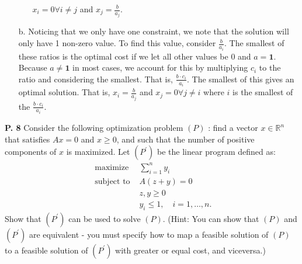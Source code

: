 \documentclass{article}
\begin{document}
\begin{jacklist}
\begin{itemize}
\begin{itemize}
                    $x_i = 0 \forall i \neq j$ and $x_j = \frac{b}{a_j}$. 
            \end{itemize}
        \item [b.] Noticing that we only have one constraint, we note that the solution will only have 1 non-zero value. To 
            find this value, consider $ \frac{b}{a_i}$. The smallest of these ratios is the optimal cost if we let all other values
            be 0 and $a = \textbf{1}$. Because $a \neq \textbf{1}$ in most cases, we account for this by multiplying $c_i$ to the ratio 
            and considering the smallest. That is, $ \frac{b \cdot c_i}{a_i}$. The smallest of this gives an optimal solution. That is, 
            $x_i = \frac{b}{a_j}$ and $x_j = 0 \forall j \neq i$ where $i$ is the smallest of the $ \frac{b \cdot c_i}{a_i}$. 
    \end{itemize}
\newpage
    \begin{framed} 
    \item [\textbf{P. 8}] Consider the following optimization problem $(P)$ : find a vector $x \in \mathbb{R}^{n}$ that satisfies 
        $A x=0$ and $x \geq 0$, and such that the number of positive components of $x$ is maximized. Let $\left(P^{\prime}\right)$ 
        be the linear program defined as: 
        \[ 
            \begin{aligned}
                \text { maximize } & \sum_{i=1}^{n} y_{i} \\
                \text { subject to } & A(z+y)=0 \\
                & z, y \geq 0 \\
                & y_{i} \leq 1, \quad i=1, \ldots, n .
            \end{aligned}
        \] Show that $\left(P^{\prime}\right)$ can be used to solve $(P)$. (Hint: You can show that $(P)$ and $\left(P^{\prime}\right)$ 
        are equivalent - you must specify how to map a feasible solution of $(P)$ to a feasible solution of 
        $\left(P^{\prime}\right)$ with greater or equal cost, and viceversa.)
    \end{framed}
\end{jacklist}
\end{document}

